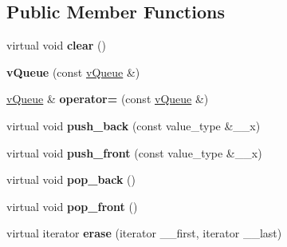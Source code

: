 \subsection*{Public Member Functions}
\begin{DoxyCompactItemize}
\item 
\hypertarget{classemorph_1_1vQueue_a8fc30b31447daf707b487c59c3474422}{virtual void {\bfseries clear} ()}\label{classemorph_1_1vQueue_a8fc30b31447daf707b487c59c3474422}

\item 
\hypertarget{classemorph_1_1vQueue_ab712a257395e442920ac0ca155080821}{{\bfseries v\-Queue} (const \hyperlink{classemorph_1_1vQueue}{v\-Queue} \&)}\label{classemorph_1_1vQueue_ab712a257395e442920ac0ca155080821}

\item 
\hypertarget{classemorph_1_1vQueue_acdd95854b75e08d82acc830de06c2377}{\hyperlink{classemorph_1_1vQueue}{v\-Queue} \& {\bfseries operator=} (const \hyperlink{classemorph_1_1vQueue}{v\-Queue} \&)}\label{classemorph_1_1vQueue_acdd95854b75e08d82acc830de06c2377}

\item 
\hypertarget{classemorph_1_1vQueue_a81fb5370e1ea9351a61225e86427651c}{virtual void {\bfseries push\-\_\-back} (const value\-\_\-type \&\-\_\-\-\_\-x)}\label{classemorph_1_1vQueue_a81fb5370e1ea9351a61225e86427651c}

\item 
\hypertarget{classemorph_1_1vQueue_a1d288086d56b6e03f39ce85210430ff0}{virtual void {\bfseries push\-\_\-front} (const value\-\_\-type \&\-\_\-\-\_\-x)}\label{classemorph_1_1vQueue_a1d288086d56b6e03f39ce85210430ff0}

\item 
\hypertarget{classemorph_1_1vQueue_a269240a67fd853ad94ebc11a0aac1f59}{virtual void {\bfseries pop\-\_\-back} ()}\label{classemorph_1_1vQueue_a269240a67fd853ad94ebc11a0aac1f59}

\item 
\hypertarget{classemorph_1_1vQueue_a4d66963ef50b8b518955ac2f744cf47f}{virtual void {\bfseries pop\-\_\-front} ()}\label{classemorph_1_1vQueue_a4d66963ef50b8b518955ac2f744cf47f}

\item 
\hypertarget{classemorph_1_1vQueue_ab79af1dcb8978f327e72ba5832dad67f}{virtual iterator {\bfseries erase} (iterator \-\_\-\-\_\-first, iterator \-\_\-\-\_\-last)}\label{classemorph_1_1vQueue_ab79af1dcb8978f327e72ba5832dad67f}


\end{DoxyCompactItemize}

